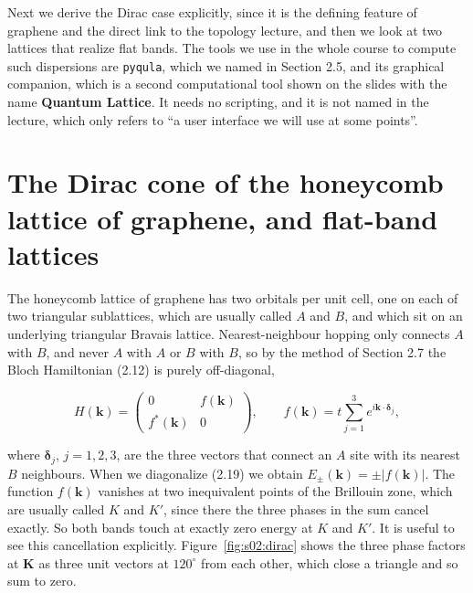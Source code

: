 

Next we derive the Dirac case explicitly, since it is the defining feature of graphene and the direct
link to the topology lecture, and then we look at two lattices that realize flat bands. The tools we
use in the whole course to compute such dispersions are \texttt{pyqula}, which we named in Section
2.5, and its graphical companion, which is a second computational tool shown on the slides with the
name \textbf{Quantum Lattice}. It needs no scripting, and it is not named in the lecture, which only refers to ``a user interface we will use at
some points''.

\section{The Dirac cone of the honeycomb lattice of graphene, and flat-band lattices}

The honeycomb lattice of graphene has two orbitals per unit cell, one on each of two triangular
sublattices, which are usually called $A$ and $B$, and which sit on an underlying triangular Bravais
lattice. Nearest-neighbour hopping only connects $A$ with $B$, and never $A$ with $A$ or $B$ with
$B$, so by the method of Section 2.7 the Bloch Hamiltonian (2.12) is purely off-diagonal,

\begin{equation}H(\mathbf{k}) = \begin{pmatrix} 0 & f(\mathbf{k}) \\ f^\ast(\mathbf{k}) & 0 \end{pmatrix},
\qquad f(\mathbf{k}) = t\sum_{j=1}^{3} e^{i\mathbf{k}\cdot\boldsymbol{\delta}_j},\end{equation}

where $\boldsymbol{\delta}_j$, $j=1,2,3$, are the three vectors that connect an $A$ site with its
nearest $B$ neighbours. When we diagonalize (2.19) we obtain $E_\pm(\mathbf{k})=\pm|f(\mathbf{k})|$.
The function $f(\mathbf{k})$ vanishes at two inequivalent points of the Brillouin zone, which are
usually called $K$ and $K'$, since there the three phases in the sum cancel exactly. So both bands touch at exactly zero energy at $K$ and $K'$. It is useful to see this cancellation
explicitly. Figure~\ref{fig:s02:dirac} shows the three phase factors at $\mathbf{K}$ as three unit
vectors at $120^\circ$ from each other, which close a triangle and so sum to zero.



